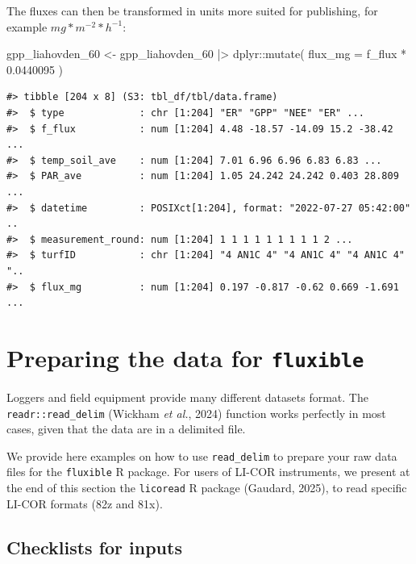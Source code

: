 \documentclass[
  letterpaper,
  DIV=11,
  numbers=noendperiod]{scrartcl}
\newenvironment{Shaded}{\begin{snugshade}}{\end{snugshade}}
\newcommand{\AttributeTok}[1]{\textcolor[rgb]{0.40,0.45,0.13}{#1}}
\newcommand{\FloatTok}[1]{\textcolor[rgb]{0.68,0.00,0.00}{#1}}
\newcommand{\FunctionTok}[1]{\textcolor[rgb]{0.28,0.35,0.67}{#1}}
\newcommand{\NormalTok}[1]{\textcolor[rgb]{0.00,0.23,0.31}{#1}}
\newcommand{\OtherTok}[1]{\textcolor[rgb]{0.00,0.23,0.31}{#1}}
\newcommand{\SpecialCharTok}[1]{\textcolor[rgb]{0.37,0.37,0.37}{#1}}
\begin{document}
The fluxes can then be transformed in units more suited for publishing,
for example \(mg * m^{-2} * h^{-1}\):

\begin{Shaded}
\begin{Highlighting}[]
\NormalTok{gpp\_liahovden\_60 }\OtherTok{\textless{}{-}}\NormalTok{ gpp\_liahovden\_60 }\SpecialCharTok{|\textgreater{}}
\NormalTok{  dplyr}\SpecialCharTok{::}\FunctionTok{mutate}\NormalTok{(}
    \AttributeTok{flux\_mg =}\NormalTok{ f\_flux }\SpecialCharTok{*} \FloatTok{0.0440095}
\NormalTok{  )}
\end{Highlighting}
\end{Shaded}

\begin{verbatim}
#> tibble [204 x 8] (S3: tbl_df/tbl/data.frame)
#>  $ type             : chr [1:204] "ER" "GPP" "NEE" "ER" ...
#>  $ f_flux           : num [1:204] 4.48 -18.57 -14.09 15.2 -38.42 ...
#>  $ temp_soil_ave    : num [1:204] 7.01 6.96 6.96 6.83 6.83 ...
#>  $ PAR_ave          : num [1:204] 1.05 24.242 24.242 0.403 28.809 ...
#>  $ datetime         : POSIXct[1:204], format: "2022-07-27 05:42:00" ..
#>  $ measurement_round: num [1:204] 1 1 1 1 1 1 1 1 1 2 ...
#>  $ turfID           : chr [1:204] "4 AN1C 4" "4 AN1C 4" "4 AN1C 4" "..
#>  $ flux_mg          : num [1:204] 0.197 -0.817 -0.62 0.669 -1.691 ...
\end{verbatim}

\section{\texorpdfstring{Preparing the data for
\texttt{fluxible}}{Preparing the data for fluxible}}\label{sec-dataprep}

Loggers and field equipment provide many different datasets format. The
\texttt{readr::read\_delim} (Wickham \emph{et al.}, 2024) function works
perfectly in most cases, given that the data are in a delimited file.

We provide here examples on how to use \texttt{read\_delim} to prepare
your raw data files for the \texttt{fluxible} R package. For users of
LI-COR instruments, we present at the end of this section the
\texttt{licoread} R package (Gaudard, 2025), to read specific LI-COR
formats (82z and 81x).

\subsection{Checklists for inputs}\label{checklists-for-inputs}
\end{document}
